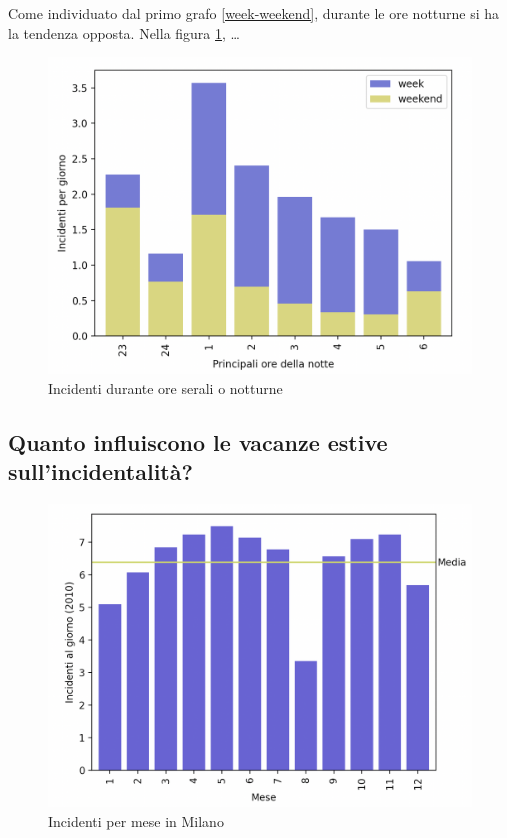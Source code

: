 \documentclass[a4paper]{report}
\begin{document}
Come individuato dal primo grafo \ref{week-weekend}, durante le 
ore notturne si ha la tendenza opposta.
Nella figura \ref{fig:ore-notte}, \dots

\begin{figure}
    \includegraphics[width=\linewidth]{../src/incidenti/incidenti_senza_coords/ore_punta/ore_notte.png}
    \caption{Incidenti durante ore serali o notturne}
    \label{fig:ore-notte}
\end{figure}


\subsection{Quanto influiscono le vacanze estive sull'incidentalità?}

\begin{figure}
    \includegraphics[width=\linewidth]{../src/incidenti/incidenti_senza_coords/mese_incidenti/milano_mese.png}
    \caption{Incidenti per mese in Milano}
    \label{fig:milano-mese}
\end{figure}
\end{document}

